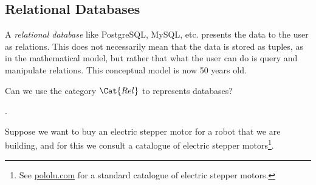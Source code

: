 %
%
%


\subsection{Relational Databases}
\label{def:relational-databases}

A \emph{relational database} like PostgreSQL, MySQL, etc. presents 
the data to the user as relations. This does not necessarily mean
that the data is stored as tuples, as in the mathematical model, but 
rather that what the user can do is query and manipulate relations.
This conceptual model is now 50 years old.

Can we use the category $\Cat{Rel}$ to represents databases? 

.

Suppose we want to buy an electric stepper motor for a robot that we are building, and for this we consult a catalogue of electric stepper motors\footnote{See \href{https://www.pololu.com/category/87/stepper-motors}{pololu.com} for a standard catalogue of electric stepper motors.}. 

